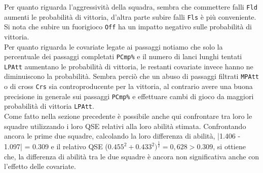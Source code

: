 Per quanto riguarda l'aggressività della squadra, sembra che commettere falli  \texttt{Fld} aumenti le probabilità di vittoria, d'altra parte subire falli \texttt{Fls} è più conveniente.\\ 
Si nota che subire un fuorigioco \texttt{Off} ha un impatto negativo sulle probabilità di vittoria.\\
Per quanto riguarda le covariate legate ai passaggi notiamo che solo la percentuale dei passaggi completati \texttt{PCmp\%} e il numero di lanci lunghi tentati \texttt{LPAtt} aumentano le probabilità di vittoria, le restanti covariate invece hanno ne diminuiscono la probabilità. Sembra perciò che un abuso di passaggi filtrati \texttt{MPAtt} o di cross \texttt{Crs} sia controproducente per la vittoria, al contrario avere una buona precisione in generale sui passaggi \texttt{PCmp\%} e effettuare cambi di gioco da maggiori probabilità di vittoria \texttt{LPAtt}. \\

Come fatto nella sezione precedente è possibile anche qui confrontare tra loro le squadre utilizzando i loro QSE relativi alla loro abilità stimata.
Confrontando ancora le prime due squadre, calcolando la loro differenza di abilità, |1.406 - 1.097| = 0.309 e il relativo QSE ($0.455^2 + 0.433^2)^\frac{1}{2}=0,628 > 0.309$, si ottiene che, la differenza di abilità tra le due squadre è ancora non significativa anche con l’effetto delle covariate.

